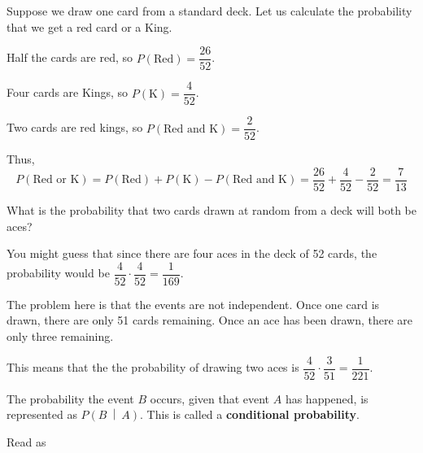 \documentclass{beamer}
\newcommand{\prob}[1]{P\left(#1\right)}
\newcommand{\condprob}[2]{\prob{#1~\middle|~#2}}
\begin{document}
\begin{frame}
\begin{example}
Suppose we draw one card from a standard deck. Let us calculate the probability that we get a red card or a King.\pause

\vspace{2mm}
Half the cards are red, so $\prob{\text{Red}}=\dfrac{26}{52}$.\pause

\vspace{2mm}
Four cards are Kings, so $\prob{\text{K}}=\dfrac{4}{52}$.\pause

\vspace{2mm}
Two cards are red kings, so $\prob{\text{Red and K}}=\dfrac{2}{52}$.\pause

\vspace{2mm}
Thus,
\begin{equation*}
\prob{\text{Red or K}} 
= \prob{\text{Red}} + \prob{\text{K}} - \prob{\text{Red and K}}
= \dfrac{26}{52} + \dfrac{4}{52} - \dfrac{2}{52}
= \dfrac{7}{13}
\end{equation*}
\end{example}
\end{frame}

\begin{frame}
\begin{example}
What is the probability that two cards drawn at random from a deck will both be aces?\pause

\vspace{2mm}
You might guess that since there are four aces in the deck of 52 cards, the probability would be $\dfrac{4}{52}\cdot\dfrac{4}{52}=\dfrac{1}{169}$.\pause

\vspace{2mm}
The problem here is that the events are not independent. Once one card is drawn, there are only 51 cards remaining. Once an ace has been drawn, there are only three remaining.\pause

\vspace{2mm}
This means that the the probability of drawing two aces is $\dfrac{4}{52}\cdot\dfrac{3}{51}=\dfrac{1}{221}$.
\end{example}\pause

\begin{definition}
The probability the event $B$ occurs, given that event $A$ has happened, is represented as $\condprob{B}{A}$. This is called a \textbf{conditional probability}.

\vspace{2mm}
Read as 
\end{definition}
\end{frame}
\end{document}
